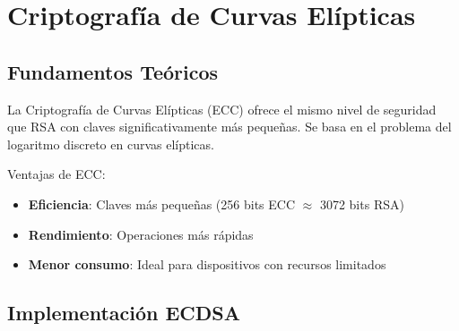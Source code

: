 \documentclass[12pt,a4paper]{article}
\begin{document}
\section{Criptografía de Curvas Elípticas}

\subsection{Fundamentos Teóricos}

La Criptografía de Curvas Elípticas (ECC) ofrece el mismo nivel de seguridad
que RSA con claves significativamente más pequeñas. Se basa en el problema del
logaritmo discreto en curvas elípticas.

Ventajas de ECC:
\begin{itemize}
    \item \textbf{Eficiencia}: Claves más pequeñas (256 bits ECC $\approx$ 3072 bits RSA)
    \item \textbf{Rendimiento}: Operaciones más rápidas
    \item \textbf{Menor consumo}: Ideal para dispositivos con recursos limitados
\end{itemize}

\subsection{Implementación ECDSA}
\end{document}
